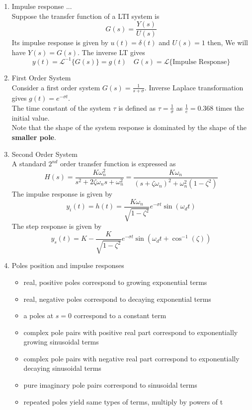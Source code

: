 \begin{enumerate}
    \item Impulse response ... \\
    Suppose the transfer function of a LTI system is
    \[G(s) = \frac{Y(s)}{U(s)}\]
    Its impulse response is given by $u(t) = \delta(t)$ and $U(s) = 1$ then, We will have $Y(s) = G(s)$. The inverse LT gives 
    \[y(t) = \mathscr{L}^{-1}\{G(s)\}=g(t) \quad G(s) = \mathscr{L}\{\text{Impulse Response}\}\]
    \item First Order System \\
    Consider a first order system $\displaystyle G(s) = \frac{1}{s+\sigma}$. Inverse Laplace transformation gives $g(t) = e^{-\sigma t}$. \\
    The time constant of the system $\tau$ is defined as $\displaystyle \tau = \frac{1}{\sigma}$ as $\displaystyle \frac{1}{e} = 0.368$ times the initial value. \\
    Note that the shape of the system response is dominated by the shape of the \textbf{smaller pole}.
    \item Second Order System \\
    A standard $2^{nd}$ order transfer function is expressed as
    \[H(s) = \frac{K \omega_n^2}{s^2 + 2 \zeta \omega_n s + \omega_n^2} = \frac{K \omega_n}{(s + \zeta \omega_n)^2 + \omega_n^2 (1 - \zeta^2)}\]
    The impulse response is given by
    \[y_i(t) = h(t) = \frac{K \omega_n}{\sqrt{1 - \zeta^2}} e^{-\sigma t} \sin(\omega_d t)\]
    The step response is given by
    \[y_s(t) = K - \frac{K}{\sqrt{1 - \zeta^2}} e^{-\sigma t} \sin(\omega_d t + \cos^{-1}(\zeta))\]
    \item Poles position and impulse responses
    \begin{itemize}
        \item real, positive poles correspond to growing exponential terms
        \item real, negative poles correspond to decaying exponential terms
        \item a poles at $s = 0$ correspond to a constant term
        \item complex pole pairs with positive real part correspond to exponentially growing sinusoidal terms
        \item complex pole pairs with negative real part correspond to exponentially decaying sinusoidal terms
        \item pure imaginary pole pairs correspond to sinusoidal terms
        \item repeated poles yield same types of terms, multiply by powers of t
    \end{itemize}
\end{enumerate}
